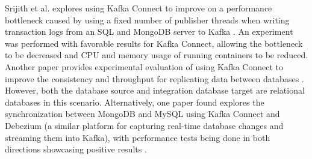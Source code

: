 Srijith et al. explores using Kafka Connect to improve on a performance bottleneck caused by using a fixed number of publisher threads when writing transaction logs from an SQL and MongoDB server to Kafka \cite{srijithkafkaconnectperformance}. An experiment was performed with favorable results for Kafka Connect, allowing the bottleneck to be decreased and \ac{CPU} and memory usage of running containers to be reduced. Another paper provides experimental evaluation of using Kafka Connect to improve the consistency and throughput for replicating data between databases \cite{adilaoptimizationkafkaconnect}. However, both the database source and integration database target are relational databases in this scenario. Alternatively, one paper found explores the synchronization between MongoDB and MySQL using Kafka Connect and Debezium (a similar platform for capturing real-time database changes and streaming them into Kafka), with performance tests being done in both directions showcasing positive results \cite{sqlmongosync}.

